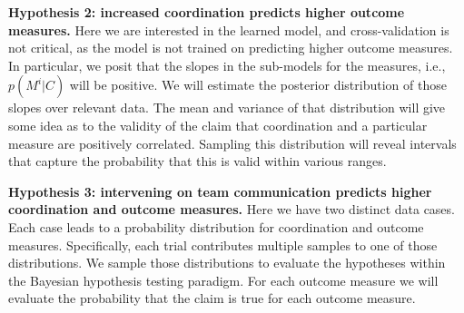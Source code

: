 \noindent \textbf{Hypothesis 2: increased coordination predicts higher outcome measures.}
Here we are interested in the learned model, and cross-validation is not
critical, as the model is not trained on predicting higher outcome measures.  In
particular, we posit that the slopes in the sub-models for the measures, i.e.,
$p(M^i|C)$ will be positive. We will estimate the posterior distribution of
those slopes over relevant data. The mean and variance of that distribution will
give some idea as to the validity of the claim that coordination and a
particular measure are positively correlated.  Sampling this distribution will
reveal intervals that capture the probability that this is valid within various
ranges. 

\noindent \textbf{Hypothesis 3: intervening on team communication predicts higher
coordination and outcome measures.} Here we have two distinct data cases. Each
case leads to a probability distribution for coordination and outcome measures.
Specifically, each trial contributes multiple samples to one of those
distributions. We sample those distributions to evaluate the hypotheses within
the Bayesian hypothesis testing paradigm.  For each outcome measure we will
evaluate the probability that the claim is true for each outcome measure.
